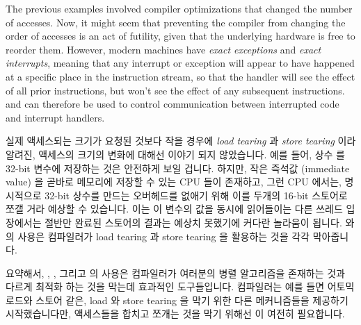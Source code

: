 The previous examples involved compiler optimizations that
changed the number of accesses.
Now, it might seem that preventing the compiler from changing the
order of accesses is an act of futility, given that the underlying
hardware is free to reorder them.
However, modern machines have \emph{exact exceptions} and
\emph{exact interrupts}, meaning that any interrupt or exception will
appear to have happened at a specific place in the instruction
stream, so that the handler will see the effect of all prior
instructions, but won't see the effect of any subsequent instructions.
 and  can therefore be used to
control communication between interrupted code and interrupt handlers.
\fi

실제 액세스되는 크기가 요청된 것보다 작을 경우에 \emph{load tearing} 과
\emph{store tearing} 이라 알려진, 액세스의 크기의 변화에 대해선 이야기 되지
않았습니다.
예를 들어, 상수  를 32-bit 변수에 저장하는 것은 안전하게 보일
겁니다.
하지만, 작은 즉석값 (immediate value) 을 곧바로 메모리에 저장할 수 있는 CPU
들이 존재하고, 그런 CPU 에서는, 명시적으로 32-bit 상수를 만드는 오버헤드를
없애기 위해 이를 두개의 16-bit 스토어로 쪼갤 거라 예상할 수 있습니다.
이는 이 변수의 값을 동시에 읽어들이는 다른 쓰레드 입장에서는 절반만 완료된
스토어의 결과는 예상치 못했기에 커다란 놀라움이 됩니다.
 와  의 사용은 컴파일러가 load tearing 과
store tearing 을 활용하는 것을 각각 막아줍니다.

요약해서, , , 그리고  의 사용은
컴파일러가 여러분의 병렬 알고리즘을 존재하는 것과 다르게 최적화 하는 것을
막는데 효과적인 도구들입니다.
컴파일러는 예를 들면  어토믹 로드와 스토어 같은, load
와 store tearing 을 막기 위한 다른 메커니즘들을 제공하기 시작했습니다만,
액세스들을 합치고 쪼개는 것을 막기 위해선  이 여전히 필요합니다.
\iffalse

